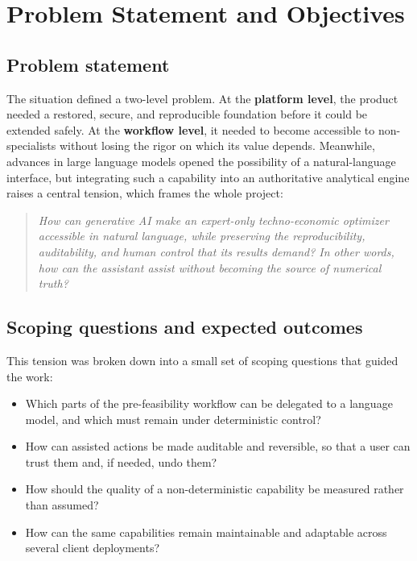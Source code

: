 \section{Problem Statement and Objectives}

\subsection{Problem statement}

The situation defined a two-level problem. At the \textbf{platform level}, the
product needed a restored, secure, and reproducible foundation before it could
be extended safely. At the \textbf{workflow level}, it needed to become
accessible to non-specialists without losing the rigor on which its value
depends. Meanwhile, advances in large language models opened the possibility of
a natural-language interface, but integrating such a capability into an
authoritative analytical engine raises a central tension, which frames the whole
project:

\begin{quote}
\textit{How can generative AI make an expert-only techno-economic optimizer
accessible in natural language, while preserving the reproducibility,
auditability, and human control that its results demand? In other words, how can
the assistant \emph{assist} without becoming the source of numerical truth?}
\end{quote}

\subsection{Scoping questions and expected outcomes}

This tension was broken down into a small set of scoping questions that guided the
work:

\begin{itemize}
  \item Which parts of the pre-feasibility workflow can be delegated to a language
    model, and which must remain under deterministic control?
  \item How can assisted actions be made auditable and reversible, so that a user
    can trust them and, if needed, undo them?
  \item How should the quality of a non-deterministic capability be measured
    rather than assumed?
  \item How can the same capabilities remain maintainable and adaptable across
    several client deployments?
\end{itemize}


